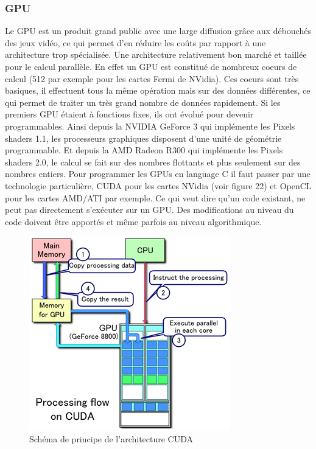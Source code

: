 \documentclass[11pt]{article}
\begin{document}
			\subsubsection{GPU}
			Le GPU est un produit grand public avec une large diffusion grâce aux débouchés des jeux vidéo, ce qui permet d'en réduire les coûts 
			par rapport à une architecture trop spécialisée. Une architecture relativement bon marché et taillée pour le calcul parallèle.
			En effet un GPU est constitué de nombreux coeurs de calcul (512 par exemple pour les cartes Fermi de NVidia). Ces coeurs sont très basiques, 
			il effectuent tous la même opération mais sur des données différentes, ce qui permet de traiter un très grand nombre de données rapidement.
			Si les premiers GPU étaient à fonctions fixes, ils ont évolué pour devenir programmables. Ainsi depuis la NVIDIA GeForce 3 qui 
			implémente les Pixels shaders 1.1, les processeurs graphiques disposent d'une unité de géométrie programmable. Et depuis la AMD Radeon 
			R300 qui implémente les Pixels shaders 2.0, le calcul se fait sur des nombres flottants et plus seulement sur des nombres entiers. \newline
			Pour programmer les GPUs en language C il faut passer par une technologie particulière, CUDA pour les cartes NVidia (voir figure 22) et OpenCL pour les cartes 
			AMD/ATI par exemple. Ce qui veut dire qu'un code existant, ne peut pas directement s'exécuter sur un GPU. Des modifications au niveau du 
			code doivent être apportés et même parfois au niveau algorithmique.
			\begin{figure}
			\begin{center}
			\includegraphics[scale=0.6]{CUDA_processing.png}
			\caption{Schéma de principe de l'architecture CUDA}
			\end{center}
			\end{figure}
\end{document}
